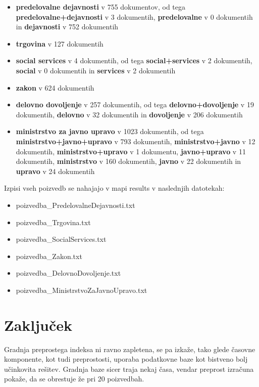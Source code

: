\documentclass[conference]{IEEEtran}
\begin{document}
	\begin{itemize}
		\item \textbf{predelovalne dejavnosti} v 755 dokumentov, od tega \textbf{predelovalne+dejavnosti} v 3 dokumentih,\textbf{ predelovalne} v 0 dokumentih in \textbf{dejavnosti} v 752 dokumentih
		\item \textbf{trgovina} v 127 dokumentih
		\item \textbf{social services} v 4 dokumentih, od tega \textbf{social+services} v 2 dokumentih, \textbf{social} v 0 dokumentih in \textbf{services} v 2 dokumentih
		\item \textbf{zakon} v 624 dokumentih
		\item \textbf{delovno dovoljenje} v 257 dokumentih, od tega \textbf{delovno+dovoljenje} v 19 dokumentih, \textbf{delovno} v 32 dokumentih in \textbf{dovoljenje} v 206 dokumentih
		\item \textbf{ministrstvo za javno upravo} v 1023 dokumentih, od tega \textbf{ministrstvo+javno+upravo} v  793 dokumentih, \textbf{ministrstvo+javno} v  12 dokumentih, \textbf{ministrstvo+upravo} v 1 dokumentu, \textbf{javno+upravo} v 11 dokumentih, \textbf{ministrstvo} v 160 dokumentih, \textbf{javno} v 22 dokumentih in \textbf{upravo} v  24 dokumentih
	\end{itemize}


	Izpisi vseh poizvedb se nahajajo v mapi results v naslednjih datotekah:
	\begin{itemize}
		\item poizvedba\_PredelovalneDejavnosti.txt
		\item poizvedba\_Trgovina.txt
		\item poizvedba\_SocialServices.txt
		\item poizvedba\_Zakon.txt
		\item poizvedba\_DelovnoDovoljenje.txt
		\item poizvedba\_MinistrstvoZaJavnoUpravo.txt
	\end{itemize}


	\section{Zaključek}

	Gradnja preprostega indeksa ni ravno zapletena, se pa izkaže, tako glede časovne komponente, kot tudi preprostosti, uporaba podatkovne baze kot bistveno bolj učinkovita rešitev. Gradnja baze sicer traja nekaj časa, vendar preprost izračuna pokaže, da se obrestuje že pri 20 poizvedbah.  




	
	
		


	
	

	
	
	
	
\end{document}

